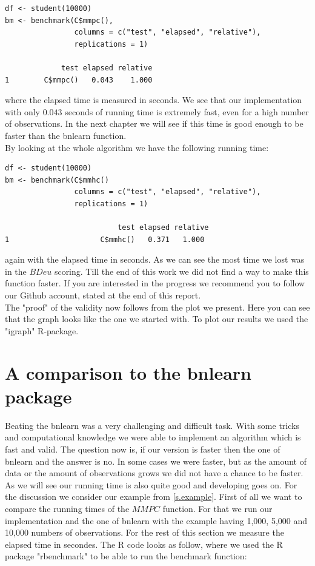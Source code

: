 		\begin{verbatim}
df <- student(10000)
bm <- benchmark(C$mmpc(),
                columns = c("test", "elapsed", "relative"),
                replications = 1)

             test elapsed relative
1        C$mmpc()   0.043    1.000
		\end{verbatim}
		
		where the elapsed time is measured in seconds. We see that our implementation with only $0.043$ seconds of running time is extremely fast, even for a high number of observations. In the next chapter we will see if this time is good enough to be faster than the bnlearn function.\\
		By looking at the whole algorithm we have the following running time:

		\begin{verbatim}
df <- student(10000)
bm <- benchmark(C$mmhc()
                columns = c("test", "elapsed", "relative"),
                replications = 1)

                          test elapsed relative
1                     C$mmhc()   0.371   1.000
		\end{verbatim}

		again with the elapsed time in seconds. As we can see the most time we lost was in the $BDeu$ scoring. Till the end of this work we did not find a way to make this function faster. If you are interested in the progress we recommend you to follow our Github account, stated at the end of this report.\\
		The "proof" of the validity now follows from the plot we present. Here you can see that the graph looks like the one we started with. To plot our results we used the "igraph" R-package.

		 \label{img.resultingGraph}

\chapter{A comparison to the bnlearn package}

	Beating the bnlearn was a very challenging and difficult task. With some tricks and computational knowledge we were able to implement an algorithm which is fast and valid. The question now is, if our version is faster then the one of bnlearn and the answer is no. In some cases we were faster, but as the amount of data or the amount of observations grows we did not have a chance to be faster. As we will see our running time is also quite good and developing goes on. For the discussion we consider our example from \autoref{s.example}. First of all we want to compare the running times of the $MMPC$ function. For that we run our implementation and the one of bnlearn with the example having 1,000, 5,000 and 10,000 numbers of observations. For the rest of this section we measure the elapsed time in secondes. The R code looks as follow, where we used the R package "rbenchmark" to be able to run the benchmark function:

